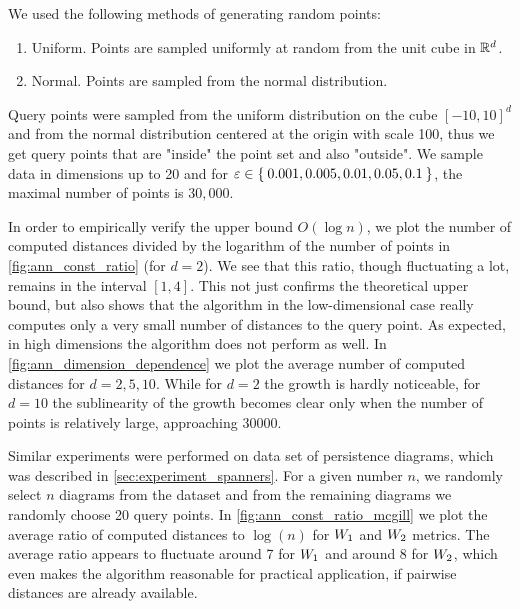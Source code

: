 We used the following methods of generating random points:
\begin{enumerate}
    \item Uniform. Points are sampled uniformly at random from the unit cube in $\mathbb{R}^d$.
    \item Normal. Points are sampled from the normal distribution.
\end{enumerate}
Query points were sampled from the uniform distribution on the cube $[-10, 10]^d$
and from the normal distribution centered at the origin with scale 100,
thus we get query points that are "inside" the point set and also "outside".
We sample data in dimensions up to 20 and for $\varepsilon \in \Set{0.001, 0.005, 0.01, 0.05, 0.1}$,
the maximal number of points is $30,000$.

In order to empirically verify the upper bound $O(\log n)$,
we plot the number of computed distances divided
by the logarithm of the number of points in \cref{fig:ann_const_ratio} (for $d = 2$).
We see that this ratio, though fluctuating a lot, remains in the interval $[1,4]$. This not just confirms
the theoretical upper bound, but also shows that the algorithm in the low-dimensional case
really computes only a very small number of distances to the query point.
As expected, in high dimensions the algorithm does not perform as well.
In \cref{fig:ann_dimension_dependence} we plot the average number of computed distances
for $d = 2, 5, 10$. While for $d = 2$ the growth is hardly noticeable, for $d = 10$
the sublinearity of the growth becomes clear only when the number of points is relatively large,
approaching 30000.



Similar experiments were performed on  data set of persistence
diagrams, which was described in \cref{sec:experiment_spanners}.
For a given number $n$, we randomly select $n$ diagrams from the dataset
and from the remaining diagrams we randomly choose 20 query points.
In \cref{fig:ann_const_ratio_mcgill} we plot the average ratio of computed
distances to $\log(n)$ for ${W_{1}}$ and ${W_{2}}$ metrics.
The average ratio appears to fluctuate around 7 for ${W_{1}}$ and around 8 for ${W_{2}}$,
which even makes the algorithm
reasonable for practical application, if pairwise distances are already available.

